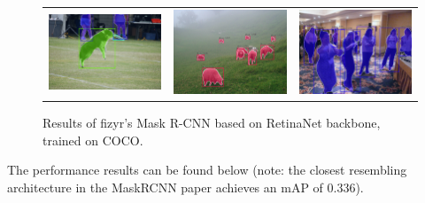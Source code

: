 \begin{figure}[H]
	\centering
	\setlength{\tabcolsep}{0.5pt}
	\setlength{\fboxsep}{0pt}%
	\setlength{\fboxrule}{0.1pt}%
	\renewcommand{\arraystretch}{0.6}
	\begin{tabular}{ccc}
		\includegraphics[width=.35\textwidth]{./figures/fizyr/01} & 
		\includegraphics[width=.31\textwidth]{./figures/fizyr/02} &
		\includegraphics[width=.31\textwidth]{./figures/fizyr/03}\\
	\end{tabular}
	\caption{Results of fizyr's Mask R-CNN based on RetinaNet backbone, trained on COCO.}
	\label{f:fizyr} %
\end{figure}

The performance results can be found below (note: the closest resembling architecture in the MaskRCNN paper achieves an mAP of 0.336).

